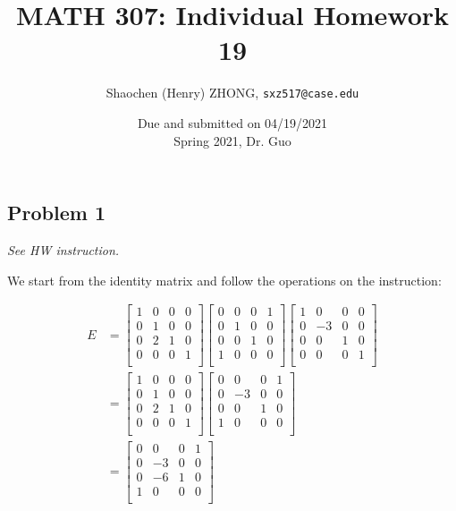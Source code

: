 \documentclass[11pt]{article}
\newcommand{\ilc}{\texttt}
\providecommand{\qbm}[1]{\begin{bmatrix} #1 \end{bmatrix}}
\begin{document}
\title{\textbf{MATH 307: Individual Homework 19}}


\author{Shaochen (Henry) ZHONG, \ilc{sxz517@case.edu}}

\date{Due and submitted on 04/19/2021 \\ Spring 2021, Dr. Guo}
\maketitle



\subsection*{Problem 1}
\textit{See HW instruction.}\newline

We start from the identity matrix and follow the operations on the instruction:

\begin{align*}
    E &= \qbm{1 & 0 & 0 & 0 \\
        0 & 1 & 0 & 0 \\
        0 & 2 & 1 & 0 \\
        0 & 0 & 0 & 1 \\}
    \qbm{0 & 0 & 0 & 1 \\
        0 & 1 & 0 & 0 \\
        0 & 0 & 1 & 0 \\
        1 & 0 & 0 & 0 \\}
    \qbm{1 & 0 & 0 & 0 \\
        0 & -3 & 0 & 0 \\
        0 & 0 & 1 & 0 \\
        0 & 0 & 0 & 1 \\} \\
    &= \qbm{1 & 0 & 0 & 0 \\
        0 & 1 & 0 & 0 \\
        0 & 2 & 1 & 0 \\
        0 & 0 & 0 & 1 \\}
        \qbm{0 & 0 & 0 & 1 \\
            0 & -3 & 0 & 0 \\
            0 & 0 & 1 & 0 \\
            1 & 0 & 0 & 0 \\} \\
    &= \qbm{0 & 0 & 0 & 1 \\
        0 & -3 & 0 & 0 \\
        0 & -6 & 1 & 0 \\
        1 & 0 & 0 & 0 \\}
\end{align*}
\end{document}
